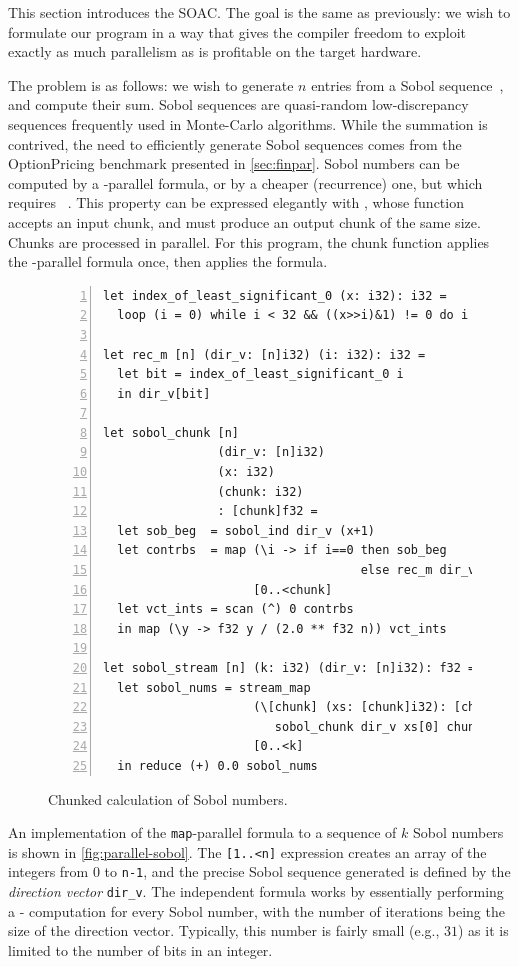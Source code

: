 This section introduces the \StreamMap{} SOAC.  The goal is the same
as previously: we wish to formulate our program in a way that gives
the compiler freedom to exploit exactly as much parallelism as is
profitable on the target hardware.

The problem is as follows: we wish to generate $n$ entries from a
Sobol sequence~\cite{Sobol}, and compute their sum.  Sobol sequences
are quasi-random low-discrepancy sequences frequently used in
Monte-Carlo algorithms.  While the summation is contrived, the need to
efficiently generate Sobol sequences comes from the OptionPricing
benchmark presented in \cref{sec:finpar}.  Sobol numbers can be
computed by a -parallel formula, or by a cheaper (recurrence)
one, but which requires ~\cite{FinPar:TACO}.  This property
can be expressed elegantly with \StreamMap{}, whose function accepts
an input chunk, and must produce an output chunk of the same size.
Chunks are processed in parallel.  For this program, the chunk
function applies the -parallel formula once, then applies the
 formula.

\begin{figure}
\begin{lstlisting}[numbers=left]
let index_of_least_significant_0 (x: i32): i32 =
  loop (i = 0) while i < 32 && ((x>>i)&1) != 0 do i + 1

let rec_m [n] (dir_v: [n]i32) (i: i32): i32 =
  let bit = index_of_least_significant_0 i
  in dir_v[bit]

let sobol_chunk [n]
                (dir_v: [n]i32)
                (x: i32)
                (chunk: i32)
                : [chunk]f32 =
  let sob_beg  = sobol_ind dir_v (x+1)
  let contrbs  = map (\i -> if i==0 then sob_beg
                                    else rec_m dir_v (i+x))
                     [0..<chunk]
  let vct_ints = scan (^) 0 contrbs
  in map (\y -> f32 y / (2.0 ** f32 n)) vct_ints

let sobol_stream [n] (k: i32) (dir_v: [n]i32): f32 =
  let sobol_nums = stream_map
                     (\[chunk] (xs: [chunk]i32): [chunk]f32 ->
                        sobol_chunk dir_v xs[0] chunk)
                     [0..<k]
  in reduce (+) 0.0 sobol_nums
\end{lstlisting}
\caption{Chunked calculation of Sobol numbers.}
\label{fig:streamed-sobol}
\end{figure}

An implementation of the \texttt{map}-parallel formula to a sequence
of
$k$ Sobol numbers is shown in \cref{fig:parallel-sobol}.  The
\texttt{[1..<n]} expression creates an array of the integers from
$0$ to \texttt{n-1}, and the precise Sobol sequence generated is
defined by the \textit{direction vector} \texttt{dir\_v}.  The
independent formula works by essentially performing a
- computation for every Sobol number, with the
number of iterations being the size of the direction vector.
Typically, this number is fairly small (e.g., $31$) as it is limited
to the number of bits in an integer.

